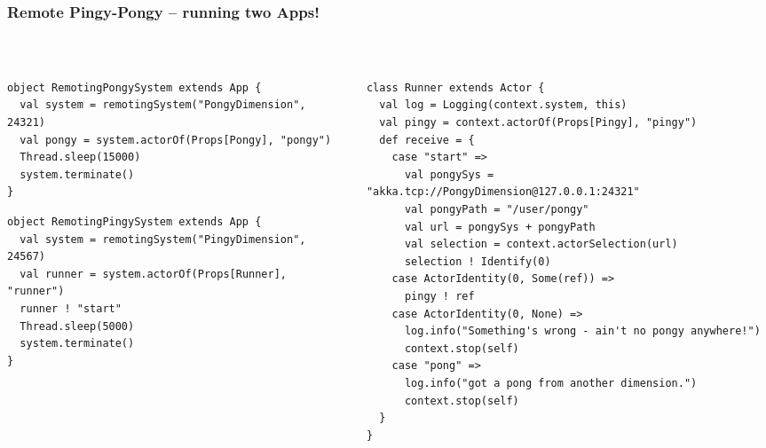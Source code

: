 \documentclass[aspectratio=169]{beamer}
\begin{document}
\begin{frame}[fragile]\frametitle{Remote Pingy-Pongy -- running two Apps!}
~\\[-6mm]
\begin{columns}[t]
\begin{column}{0.46\textwidth}
\begin{lstlisting}[basicstyle=\ttfamily\tiny,emph={Actor, pingy, pongy, runner, Logging, Props, ourSystem,terminate,sleep,actorOf,receive, watch,stop,Terminated}]
object RemotingPongySystem extends App {
  val system = remotingSystem("PongyDimension", 24321)
  val pongy = system.actorOf(Props[Pongy], "pongy")
  Thread.sleep(15000)
  system.terminate()
}
\end{lstlisting}
\begin{lstlisting}[basicstyle=\ttfamily\tiny,
  emph={Actor, pingy, pongy, runner, Logging, Props, ourSystem,terminate,sleep,actorOf,receive, watch,stop,Terminated}]
object RemotingPingySystem extends App {
  val system = remotingSystem("PingyDimension", 24567)
  val runner = system.actorOf(Props[Runner], "runner")
  runner ! "start"
  Thread.sleep(5000)
  system.terminate()
}
\end{lstlisting}
\end{column}
\begin{column}{0.54\textwidth}
\begin{lstlisting}[basicstyle=\ttfamily\tiny,
  emph={Actor, pingy, pongy, runner, Logging, Props, ourSystem,terminate,sleep,actorOf,receive,become,stop}]
class Runner extends Actor {
  val log = Logging(context.system, this)
  val pingy = context.actorOf(Props[Pingy], "pingy")
  def receive = {
    case "start" =>
      val pongySys = "akka.tcp://PongyDimension@127.0.0.1:24321"
      val pongyPath = "/user/pongy"
      val url = pongySys + pongyPath
      val selection = context.actorSelection(url)
      selection ! Identify(0)
    case ActorIdentity(0, Some(ref)) =>
      pingy ! ref
    case ActorIdentity(0, None) =>
      log.info("Something's wrong - ain't no pongy anywhere!")
      context.stop(self)
    case "pong" =>
      log.info("got a pong from another dimension.")
      context.stop(self)
  }
}
\end{lstlisting}
\end{column}
\end{columns}
\end{frame}
\end{document}
